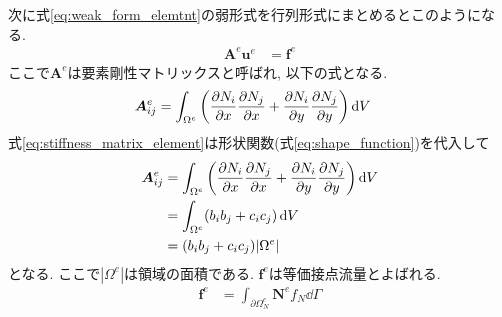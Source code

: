 \documentclass{ltjsarticle}
\begin{document}
次に式\eqref{eq:weak_form_elemtnt}の弱形式を行列形式にまとめるとこのようになる.
\begin{align}
    \bm{A}^e\bm{u}^e &= \bm{f}^e
\end{align}
ここで$\bm{A}^e$は要素剛性マトリックスと呼ばれ, 以下の式となる.
\begin{align}
    \bm{A}^e_{ij}
    &= \int_{\Omega^e} \qty(\pdv{N_i}{x}\pdv{N_j}{x} + \pdv{N_i}{y}\pdv{N_j}{y}) \dd{V}
    \label{eq:stiffness_matrix_element}
\end{align}
式\eqref{eq:stiffness_matrix_element}は形状関数(式\eqref{eq:shape_function})を代入して
\begin{align}
    \begin{split}
        \bm{A}^e_{ij}
        &= \int_{\Omega^e} \qty(\pdv{N_i}{x}\pdv{N_j}{x} + \pdv{N_i}{y}\pdv{N_j}{y}) \dd{V}  \\
        &= \int_{\Omega^e} (b_ib_j+c_ic_j)\dd{V} \\
        &= (b_ib_j+c_ic_j)|\Omega^e|
        \label{eq:stiffness_matrix_element_solved}
    \end{split}
\end{align}
となる. ここで$|\Omega^e|$は領域の面積である.
$\bm{f}^e$は等価接点流量とよばれる.
\begin{align}
    \bm{f}^e &= \int_{\partial\Omega^e_N}\bm{N}^e f_N\dd{\Gamma}
    \label{eq:nordal_flow}
\end{align}
\end{document}

